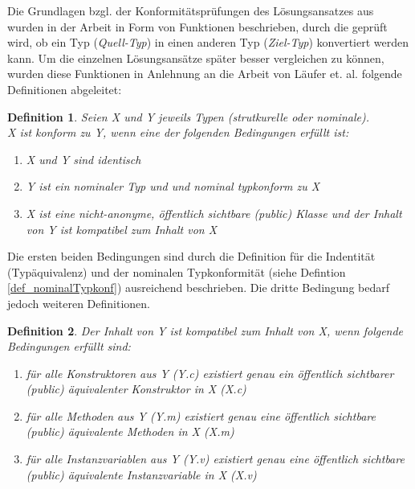 \documentclass[11pt, 
ngerman,
doublespacing,
chapterinoneline, %
consistentlayout, %
]{scrartcl}
\newtheorem{definition}{Definition}
\begin{document}
Die Grundlagen bzgl. der Konformitätsprüfungen des Lösungsansatzes aus \cite{whiteoak} wurden in der Arbeit in Form von Funktionen beschrieben, durch die geprüft wird, ob ein Typ (\emph{Quell-Typ}) in einen anderen Typ (\emph{Ziel-Typ}) konvertiert werden kann. Um die einzelnen Lösungsansätze später besser vergleichen zu können, wurden diese Funktionen in Anlehnung an die	 Arbeit von Läufer et. al. \cite{structconfjava} folgende Definitionen abgeleitet:
\begin{definition}\label{def_allgTypkonfWHITEOAK}
Seien \emph{X} und \emph{Y} jeweils Typen (strutkurelle oder nominale).\\
\emph{X} ist konform zu \emph{Y}, wenn eine der folgenden Bedingung\-en erfüllt ist:
\begin{enumerate}
\item \emph{X} und \emph{Y} sind identisch
\item \emph{Y} ist ein nominaler Typ und und nominal typkonform zu \emph{X} 
\item \emph{X} ist eine nicht-anonyme, öffentlich sichtbare (public) Klasse und der Inhalt von \emph{Y} ist kompatibel zum Inhalt von \emph{X} 
\end{enumerate}
\end{definition}
Die ersten beiden Bedingungen sind durch die Definition für die Indentität (Typäquiva\-lenz) und der nominalen Typkonformität (siehe Defintion \ref{def_nominalTypkonf}) ausreichend beschrieben. Die dritte Bedingung bedarf jedoch weiteren Definitionen.
\begin{definition}\label{def_compatibleTypesWHITEOAK}
Der Inhalt von \emph{Y} ist kompatibel zum Inhalt von \emph{X}, wenn folgende Beding\-ung\-en erfüllt sind:
\begin{enumerate}
\item für alle Konstruktoren aus \emph{Y} (\emph{Y.c}) existiert genau ein öffentlich sichtbarer \linebreak(public) äquivalenter Konstruktor in \emph{X} (\emph{X.c})
\item für alle Methoden aus \emph{Y} (\emph{Y.m}) existiert genau eine öffentlich sichtbare \linebreak(public) äquivalente Methoden in \emph{X} (\emph{X.m})
\item für alle Instanzvariablen aus \emph{Y} (\emph{Y.v}) existiert genau eine öffentlich \linebreak sichtbare (public) äquivalente Instanzvariable in \emph{X} (\emph{X.v})
\end{enumerate}
\end{definition}
\end{document}
